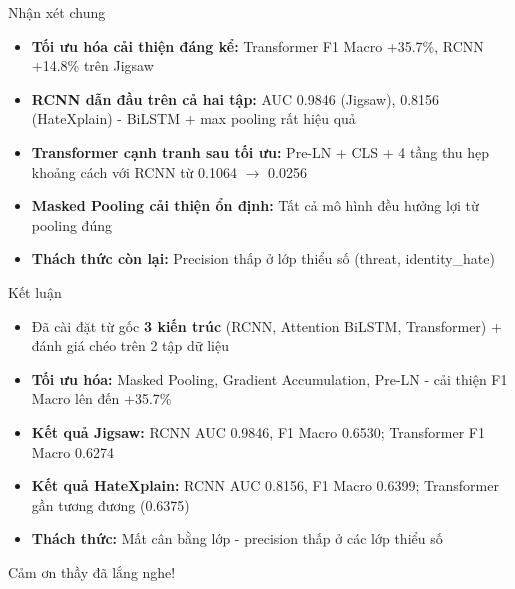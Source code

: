 \documentclass[serif, aspectratio=169]{beamer}
\begin{document}
\begin{frame}{Nhận xét chung}
\begin{itemize}
    \item \textbf{Tối ưu hóa cải thiện đáng kể:} Transformer F1 Macro +35.7\%, RCNN +14.8\% trên Jigsaw
    \item \textbf{RCNN dẫn đầu trên cả hai tập:} AUC 0.9846 (Jigsaw), 0.8156 (HateXplain) - BiLSTM + max pooling rất hiệu quả
    \item \textbf{Transformer cạnh tranh sau tối ưu:} Pre-LN + CLS + 4 tầng thu hẹp khoảng cách với RCNN từ 0.1064 $\rightarrow$ 0.0256
    \item \textbf{Masked Pooling cải thiện ổn định:} Tất cả mô hình đều hưởng lợi từ pooling đúng
    \item \textbf{Thách thức còn lại:} Precision thấp ở lớp thiểu số (threat, identity\_hate)
\end{itemize}
\end{frame}

\begin{frame}{Kết luận}
\begin{itemize}
    \item Đã cài đặt từ gốc \textbf{3 kiến trúc} (RCNN, Attention BiLSTM, Transformer) + đánh giá chéo trên 2 tập dữ liệu
    \item \textbf{Tối ưu hóa:} Masked Pooling, Gradient Accumulation, Pre-LN - cải thiện F1 Macro lên đến +35.7\%
    \item \textbf{Kết quả Jigsaw:} RCNN AUC 0.9846, F1 Macro 0.6530; Transformer F1 Macro 0.6274
    \item \textbf{Kết quả HateXplain:} RCNN AUC 0.8156, F1 Macro 0.6399; Transformer gần tương đương (0.6375)
    \item \textbf{Thách thức:} Mất cân bằng lớp - precision thấp ở các lớp thiểu số
\end{itemize}
\end{frame}

\begin{frame}
\begin{center}
    Cảm ơn thầy đã lắng nghe!
\end{center}
\end{frame}
\end{document}
